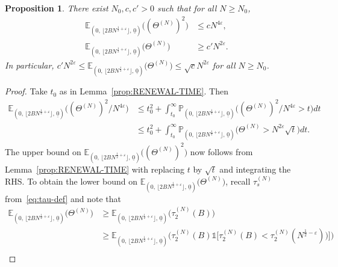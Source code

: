 \documentclass[11pt, reqno]{article}
\newtheorem{prop}[theorem]{Proposition}
\numberwithin{equation}{section}
\numberwithin{theorem}{section}
\begin{document}
\begin{prop}\label{cor:MOEMNT-RENEWAL} 
There exist $ N_0,c,c'>0$ such that for all $N\geq N_0$,
\begin{align*}
    \mathbb{E}_{(0, \, \lfloor 2BN^{\frac{1}{2}+\varepsilon} \rfloor, \,\underline{0})}\big((\Theta^{(N)})^2\big)&\leq cN^{4\varepsilon},\\
    \mathbb{E}_{(0, \, \lfloor 2BN^{\frac{1}{2}+\varepsilon} \rfloor, \,\underline{0})}\big(\Theta^{(N)}\big)&\geq c'N^{2\varepsilon}.
\end{align*}
In particular, $c'N^{2\varepsilon} \le \mathbb{E}_{(0, \, \lfloor 2BN^{\frac{1}{2}+\varepsilon} \rfloor, \,\underline{0})}\big(\Theta^{(N)}\big) \le \sqrt{c}N^{2\varepsilon}$ for all $N \ge N_0$.
\end{prop}
\begin{proof}
Take $t_0$ as in Lemma~\ref{prop:RENEWAL-TIME}.
Then
\begin{equation*}
\begin{split}
    \mathbb{E}_{(0, \, \lfloor 2BN^{\frac{1}{2}+\varepsilon} \rfloor, \,\underline{0})}\big((\Theta^{(N)})^2/N^{4\varepsilon}\big)
    &\leq t_0^2+\int_{t_0}^{\infty}\mathbb{P}_{(0, \, \lfloor 2BN^{\frac{1}{2}+\varepsilon} \rfloor, \,\underline{0})}\big((\Theta^{(N)})^2/N^{4\varepsilon}>t\big)dt\\
    &\leq t_0^2+\int_{t_0}^{\infty}\mathbb{P}_{(0, \, \lfloor 2BN^{\frac{1}{2}+\varepsilon} \rfloor, \,\underline{0})}\big(\Theta^{(N)} >N^{2\varepsilon}\sqrt{t}\big)dt.
\end{split}
\end{equation*}
The upper bound on $\mathbb{E}_{(0, \, \lfloor 2BN^{\frac{1}{2}+\varepsilon} \rfloor, \,\underline{0})}\big((\Theta^{(N)})^2\big)$ now follows from 
Lemma~\ref{prop:RENEWAL-TIME} with replacing $t$ by $\sqrt{t}$ and integrating the RHS.
To obtain the lower bound on $\mathbb{E}_{(0, \, \lfloor 2BN^{\frac{1}{2}+\varepsilon} \rfloor, \,\underline{0})}\big(\Theta^{(N)}\big)$, recall $\tau_s^{(N)}$ from~\eqref{eq:tau-def} and note that 
\begin{align}\label{eq:5.3-1}
    \mathbb{E}_{(0, \, \lfloor 2BN^{\frac{1}{2}+\varepsilon} \rfloor, \,\underline{0})}\big(\Theta^{(N)} \big)&\geq \mathbb{E}_{(0, \, \lfloor 2BN^{\frac{1}{2}+\varepsilon} \rfloor, \,\underline{0})}\big(\tau^{(N)}_2(B)\big)\nonumber\\
    &\geq \mathbb{E}_{(0, \, \lfloor 2BN^{\frac{1}{2}+\varepsilon} \rfloor, \,\underline{0})}\big(\tau^{(N)}_2(B)\mathds{1}\big[\tau^{(N)}_2(B) < \tau^{(N)}_2(N^{\frac{1}{2}-\varepsilon}))\big]\big)\nonumber\\

\end{align}
\end{proof}
\end{document}
